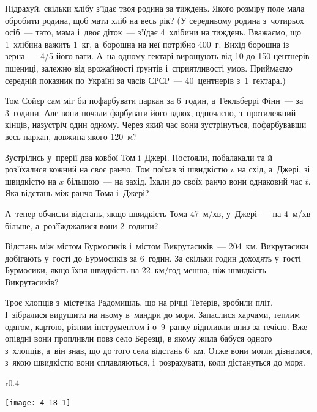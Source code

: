 \problem
Підрахуй, скільки хлібу з’їдає твоя родина за тиждень.
Якого розміру поле мала обробити родина, щоб мати хліб на весь рік?
(У середньому родина з~чотирьох осіб~--- тато, мама і~двоє діток~---
з’їдає 4~хлібини на тиждень. Вважаємо, що 1~хлібина важить 1~кг,
а~борошна на неї потрібно 400~г. Вихід борошна із зерна~--- 4/5 його ваги.
А~на одному гектарі вирощують від 10 до 150 центнерів пшениці,
залежно від врожайності ґрунтів і~сприятливості умов.
Приймаємо середній показник по Україні за часів СРСР~---
40~центнерів з~1~гектара.)


\problem
Том Сойєр сам міг би пофарбувати паркан за 6~годин,
а~Гекльберрі Фінн~--- за 3~години. Але вони почали фарбувати його вдвох,
одночасно, з~протилежний кінців, назустріч один одному.
Через який час вони зустрінуться, пофарбувавши весь паркан,
довжина якого 120~м?


\problem
Зустрілись у~прерії два ковбої Том і~Джері. Постояли, побалакали та й
роз’їхалися кожний на своє ранчо. Том поїхав зі швидкістю $v$ на схід,
а~Джері, зі швидкістю на $x$ більшою~--- на захід. Їхали до своїх ранчо
вони однаковий час $t$. Яка відстань між ранчо Тома і~Джері?

А~тепер обчисли відстань, якщо швидкість Тома 47~м/хв,
у~Джері~--- на 4~м/хв більше, а~роз’їжджалися вони 2~години?


\problem
Відстань між містом Бурмосиків і~містом Викрутасиків~--- 204~км.
Викрутасики добігають у~гості до Бурмосиків за 6~годин.
За скільки годин доходять у~гості Бурмосики,
якщо їхня швидкість на 22~км/год менша, ніж швидкість Викрутасиків?


\problem
{}
Троє хлопців з~містечка Радомишль, що на річці Тетерів, зробили пліт.
І~зібралися вирушити на ньому в~мандри до моря. Запаслися харчами,
теплим одягом, картою, різним інструментом і о~9~ранку відпливли вниз
за течією. Вже опівдні вони пропливли повз село Березці, в якому жила
бабуся одного з~хлопців, а~він знав, що до того села відстань 6~км.
Отже вони могли дізнатися, з~якою швидкістю вони сплавляються,
і~розрахувати, коли дістануться до моря.

\begin{wrapfigure}{r}{0.4\textwidth}
    \vspace{-20pt}
    \begin{center}
        \texttt{[image: 4-18-1]}
    \end{center}
    \vspace{-20pt}
\end{wrapfigure}

